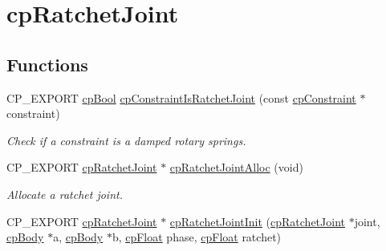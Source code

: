 \hypertarget{group__cp_ratchet_joint}{}\section{cp\+Ratchet\+Joint}
\label{group__cp_ratchet_joint}
\subsection*{Functions}
\begin{DoxyCompactItemize}
\item 
\mbox{\label{group__cp_ratchet_joint_ga76d6a70c756ccd05d081a7a7c0c058e7}} 
C\+P\+\_\+\+E\+X\+P\+O\+RT \mbox{\hyperlink{group__basic_types_gabc5e752c48f3449ca26ef413ecbd647e}{cp\+Bool}} \mbox{\hyperlink{group__cp_ratchet_joint_ga76d6a70c756ccd05d081a7a7c0c058e7}{cp\+Constraint\+Is\+Ratchet\+Joint}} (const \mbox{\hyperlink{structcp_constraint}{cp\+Constraint}} $\ast$constraint)
\begin{DoxyCompactList}\small\item\em Check if a constraint is a damped rotary springs. \end{DoxyCompactList}\item 
\mbox{\label{group__cp_ratchet_joint_ga7254bf22fa410147f1a37e57273b5b00}} 
C\+P\+\_\+\+E\+X\+P\+O\+RT \mbox{\hyperlink{structcp_ratchet_joint}{cp\+Ratchet\+Joint}} $\ast$ \mbox{\hyperlink{group__cp_ratchet_joint_ga7254bf22fa410147f1a37e57273b5b00}{cp\+Ratchet\+Joint\+Alloc}} (void)
\begin{DoxyCompactList}\small\item\em Allocate a ratchet joint. \end{DoxyCompactList}\item 
\mbox{\label{group__cp_ratchet_joint_gada638cf91c4c2ce58d9fcb2ae3345eb0}} 
C\+P\+\_\+\+E\+X\+P\+O\+RT \mbox{\hyperlink{structcp_ratchet_joint}{cp\+Ratchet\+Joint}} $\ast$ \mbox{\hyperlink{group__cp_ratchet_joint_gada638cf91c4c2ce58d9fcb2ae3345eb0}{cp\+Ratchet\+Joint\+Init}} (\mbox{\hyperlink{structcp_ratchet_joint}{cp\+Ratchet\+Joint}} $\ast$joint, \mbox{\hyperlink{structcp_body}{cp\+Body}} $\ast$a, \mbox{\hyperlink{structcp_body}{cp\+Body}} $\ast$b, \mbox{\hyperlink{group__basic_types_gac1ed65573e035bf892505768c852d8d3}{cp\+Float}} phase, \mbox{\hyperlink{group__basic_types_gac1ed65573e035bf892505768c852d8d3}{cp\+Float}} ratchet)

\end{DoxyCompactItemize}
